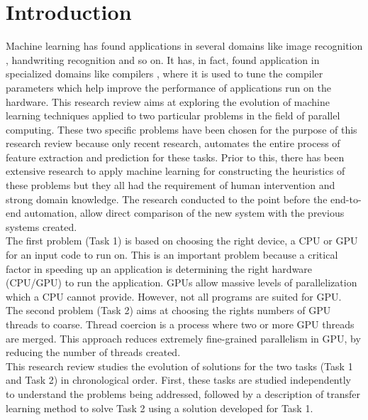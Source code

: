 \documentclass[a4paper,11pt]{article}
\begin{document}
\section{Introduction}
  \indent \indent Machine learning has found applications in several domains like image recognition \cite{zero1}, handwriting recognition \cite{zero2} and so on. It has, in fact, found application in specialized domains like compilers \cite{zero3,zero4}, where it is used to tune the compiler parameters which help improve the performance of applications run on the hardware. This research review aims at exploring the evolution of machine learning techniques applied to two particular problems in the field of parallel computing. These two specific problems have been chosen for the purpose of this research review because only recent research, \cite{first} automates the entire process of feature extraction and prediction for these tasks. Prior to this, there has been extensive research to apply machine learning for constructing the heuristics of these problems but they all had the requirement of human intervention and strong domain knowledge. The research conducted to the point before the end-to-end automation, allow direct comparison of the new system with the previous systems created.\\
  \indent The first problem (Task 1) is based on choosing the right device, a CPU or  GPU for an input code to run on. This is an important problem because a critical factor in speeding up an application is determining the right hardware (CPU/GPU) to run the application. GPUs allow massive levels of parallelization which a CPU cannot provide. However, not all programs are suited for GPU.\\
  \indent The second problem (Task 2) aims at choosing the rights numbers of GPU threads to coarse. Thread coercion is a process where two or more GPU threads are merged. This approach reduces extremely fine-grained parallelism in GPU, by reducing the number of threads created.\\
\indent This research review studies the evolution of solutions for the two tasks (Task 1 and Task 2) in chronological order. First, these tasks are studied independently to understand the problems being addressed, followed by a description of transfer learning method to solve Task 2 using a solution developed for Task 1.\\ 
\end{document}
